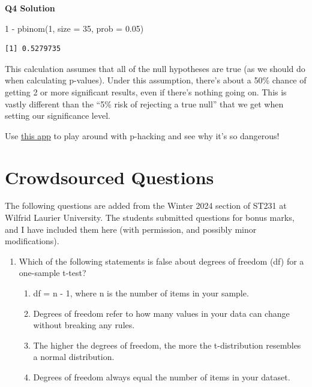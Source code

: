 \documentclass[
  letterpaper,
  DIV=11,
  numbers=noendperiod,
  oneside]{scrreprt}
\newenvironment{Shaded}{\begin{snugshade}}{\end{snugshade}}
\newcommand{\AttributeTok}[1]{\textcolor[rgb]{0.40,0.45,0.13}{#1}}
\newcommand{\DecValTok}[1]{\textcolor[rgb]{0.68,0.00,0.00}{#1}}
\newcommand{\FloatTok}[1]{\textcolor[rgb]{0.68,0.00,0.00}{#1}}
\newcommand{\FunctionTok}[1]{\textcolor[rgb]{0.28,0.35,0.67}{#1}}
\newcommand{\NormalTok}[1]{\textcolor[rgb]{0.00,0.23,0.31}{#1}}
\newcommand{\SpecialCharTok}[1]{\textcolor[rgb]{0.37,0.37,0.37}{#1}}
\providecommand{\tightlist}{%
  \setlength{\itemsep}{0pt}\setlength{\parskip}{0pt}}\usepackage{longtable,booktabs,array}
\begin{document}
\textbf{Q4 Solution}

\begin{Shaded}
\begin{Highlighting}[]
\DecValTok{1} \SpecialCharTok{{-}} \FunctionTok{pbinom}\NormalTok{(}\DecValTok{1}\NormalTok{, }\AttributeTok{size =} \DecValTok{35}\NormalTok{, }\AttributeTok{prob =} \FloatTok{0.05}\NormalTok{)}
\end{Highlighting}
\end{Shaded}

\begin{verbatim}
[1] 0.5279735
\end{verbatim}

This calculation assumes that all of the null hypotheses are true (as we
should do when calculating p-values). Under this assumption, there's
about a 50\% chance of getting 2 or more significant results, even if
there's nothing going on. This is vastly different than the ``5\% risk
of rejecting a true null'' that we get when setting our significance
level.

Use \href{https://projects.fivethirtyeight.com/p-hacking/}{this app} to
play around with p-hacking and see why it's so dangerous!

\hypertarget{crowdsourced-questions-9}{%
\section{Crowdsourced Questions}\label{crowdsourced-questions-9}}

The following questions are added from the Winter 2024 section of ST231
at Wilfrid Laurier University. The students submitted questions for
bonus marks, and I have included them here (with permission, and
possibly minor modifications).

\begin{enumerate}
\def\labelenumi{\arabic{enumi}.}
\tightlist
\item
  Which of the following statements is false about degrees of freedom
  (df) for a one-sample t-test?

  \begin{enumerate}
  \def\labelenumii{\alph{enumii}.}
  \tightlist
  \item
    df = n - 1, where n is the number of items in your sample.
  \item
    Degrees of freedom refer to how many values in your data can change
    without breaking any rules.
  \item
    The higher the degrees of freedom, the more the t-distribution
    resembles a normal distribution.
  \item
    Degrees of freedom always equal the number of items in your dataset.
  \end{enumerate}
\end{enumerate}
\end{document}
